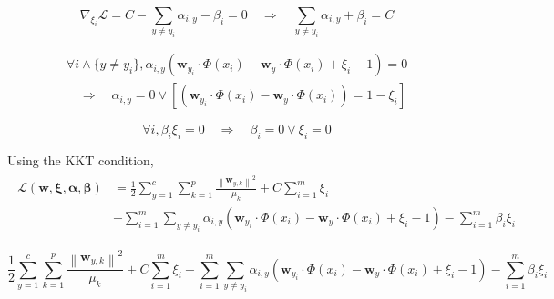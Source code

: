 \documentclass{article}
\begin{document}
\begin{equation}
    \nabla_{\xi_{i}} \mathcal{L}=C- \sum_{y \neq y_i} \alpha_{i,y}- \beta_{i}=0 
    \quad \Longrightarrow \quad 
    \sum_{y \neq y_i}\alpha_{i, y}+\beta_{i}=C
\end{equation}

\begin{equation}
    \begin{aligned}
        \forall {i} \wedge \{y \neq y_i\},
        \alpha_{i, y}
        \left(
            \bm{w}_{y_{i}} \cdot \Phi\left(x_{i}\right)
            - \bm{w}_{y} \cdot \Phi\left(x_{i}\right) 
            + \xi_{i}
            - 1
        \right) = 0 \\
        \quad \Longrightarrow \quad 
        \alpha_{i, y} = 0 \vee
        \left[
            \left(
                \bm{w}_{y_{i}} \cdot \Phi\left(x_{i}\right)
                - \bm{w}_{y} \cdot \Phi\left(x_{i}\right)
            \right)
            = 1 - \xi_{i}
        \right]
    \end{aligned}
\end{equation}

\begin{equation}
    \forall i, \beta_{i} \xi_{i}=0 \quad \Longrightarrow \quad \beta_{i}=0 \vee \xi_{i}=0
\end{equation}



Using the KKT condition,
\begin{align}
    \begin{aligned}
        \mathcal{L}(\mathbf{w}, \boldsymbol{\xi}, \bm{\alpha}, \bm{\beta}) 
        &= \frac{1}{2} \sum_{y=1}^{c} \sum_{k=1}^{p} \frac{\left\|\bm{w}_{y, k}\right\|^{2}}{\mu_{k}}
        + C \sum_{i=1}^{m} \xi_{i} \\
        &- \sum_{i=1}^{m} 
           \sum_{y \neq y_i}
            \alpha_{i, y}
            \left(
                \bm{w}_{y_{i}} \cdot \Phi\left(x_{i}\right)
                - \bm{w}_{y} \cdot \Phi\left(x_{i}\right) 
                + \xi_{i}
                - 1
            \right)
        - \sum_{i=1}^{m} \beta_{i} \xi_{i} 
    \end{aligned}
\end{align}


\begin{equation}
    \frac{1}{2} \sum_{y=1}^{c} \sum_{k=1}^{p} \frac{\left\|\mathbf{w}_{y, k}\right\|^{2}}{\mu_{k}}+C \sum_{i=1}^{m} \xi_{i} - \sum_{i=1}^{m} 
    \sum_{y \neq y_i}
     \alpha_{i, y}
     \left(
         \bm{w}_{y_{i}} \cdot \Phi\left(x_{i}\right)
         - \bm{w}_{y} \cdot \Phi\left(x_{i}\right) 
         + \xi_{i}
         - 1
     \right)
 - \sum_{i=1}^{m} \beta_{i} \xi_{i} 
\end{equation}
\end{document}
